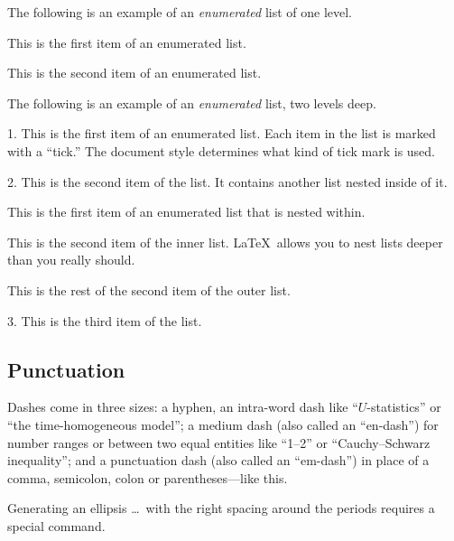 \documentclass[aos,preprint]{imsart}
\theoremstyle{remark}
\begin{document}
The following is an example of an \emph{enumerated} list of one level.

\begin{longlist}
\item This is the first item of an enumerated list.
\item This is the second item of an enumerated list.
\end{longlist}

The following is an example of an \emph{enumerated} list, two levels deep.
\begin{longlist}
\item[1.]
This is the first item of an enumerated list.  Each item
in the list is marked with a ``tick.''  The document
style determines what kind of tick mark is used.
\item[2.]
This is the second item of the list.  It contains another
list nested inside of it.
\begin{longlist}
\item
This is the first item of an enumerated list that
is nested within.  
\item
This is the second item of the inner list.  \LaTeX\
allows you to nest lists deeper than you really should.
\end{longlist}
This is the rest of the second item of the outer list.
\item[3.]
This is the third item of the list.
\end{longlist}

\subsection{Punctuation}
Dashes come in three sizes: a hyphen, an intra-word dash like ``$U$-statistics'' or ``the time-homogeneous model'';
a medium dash (also called an ``en-dash'') for number ranges or between two equal entities like ``1--2'' or ``Cauchy--Schwarz inequality'';
and a punctuation dash (also called an ``em-dash'') in place of a comma, semicolon,
colon or parentheses---like this.

Generating an ellipsis \ldots\ with the right spacing
around the periods requires a special command.
\end{document}
